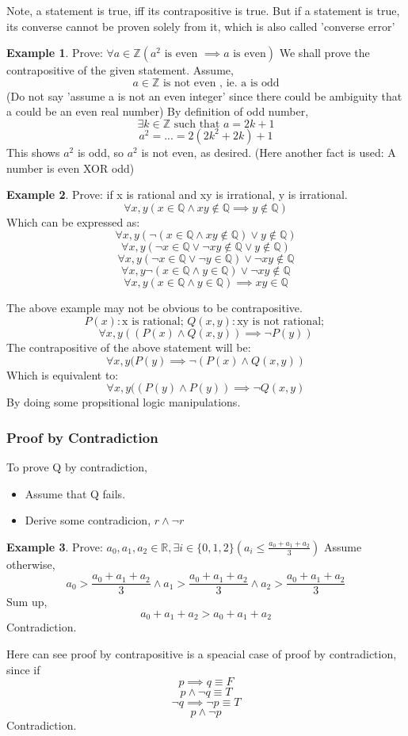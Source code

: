 \documentclass[14pt]{article}
\theoremstyle{definition}
\newtheorem*{example}{Example}
\begin{document}
Note, a statement is true, iff its contrapositive is true. But if a statement is true, its converse cannot be proven solely from it, which is also called 'converse error'
\begin{example}
    Prove: \(\forall a \in \mathbb{Z}(a^2 \text{ is even } \implies a \text{ is even}) \)
    We shall prove the contrapositive of the given statement.
    Assume, 
    \[a \in \mathbb{Z} \text{ is not even , ie. a is odd}\]
    (Do not say 'assume a is not an even integer' since there could be ambiguity that a could be an even real number)
    By definition of odd number, 
    \[\exists k \in \mathbb{Z} \text{ such that } a = 2k + 1\]
    \[a^2 = ... = 2(2k^2 + 2k) + 1\]
    This shows \(a^2\) is odd, so \(a^2\) is not even, as desired. 
    (Here another fact is used: A number is even XOR odd)
\end{example}

\begin{example}
    Prove: if x is rational and xy is irrational, y is irrational.
    \[\forall x, y(x \in \mathbb{Q} \land xy \notin \mathbb{Q} \implies y \notin \mathbb{Q})\]
    Which can be expressed as:
    \[\forall x, y(\neg(x \in \mathbb{Q} \land xy \notin \mathbb{Q}) \lor y \notin \mathbb{Q})\]
    \[\forall x, y(\neg x \in \mathbb{Q} \lor \neg xy \notin \mathbb{Q} \lor y \notin \mathbb{Q})\]
    \[\forall x, y(\neg x \in \mathbb{Q} \lor \neg y \in \mathbb{Q}) \lor \neg xy \notin \mathbb{Q}\]
    \[\forall x, y\neg (x \in \mathbb{Q} \land y \in \mathbb{Q}) \lor \neg xy \notin \mathbb{Q}\]
    \[\forall x, y(x \in \mathbb{Q} \land y \in \mathbb{Q}) \implies xy \in \mathbb{Q}\]
\end{example}
The above example may not be obvious to be contrapositive.
\[P(x): \text{x is rational; } Q(x, y): \text{xy is not rational; } \]
\[\forall x, y ((P(x)\land Q(x,y)) \implies \neg P(y))\]
The contrapositive of the above statement will be: 
\[\forall x, y (P(y) \implies \neg(P(x)\land Q(x,y))\]
Which is equivalent to:
\[\forall x, y ((P(y) \land P(y)) \implies \neg Q(x,y)\]
By doing some propsitional logic manipulations.
\subsubsection{Proof by Contradiction}
To prove Q by contradiction,
\begin{itemize}
    \item Assume that Q fails.
    \item Derive some contradicion, \(r \land \neg r\)
\end{itemize}
\begin{example}
    Prove: \(a_0, a_1, a_2 \in \mathbb{R}, \exists i \in \{0, 1, 2\} (a_i \leq \frac{a_0 + a_1 + a_2}{3})\)
    Assume otherwise, 
    \[a_0 > \frac{a_0 + a_1 + a_2}{3} \land a_1 > \frac{a_0 + a_1 + a_2}{3} \land a_2 > \frac{a_0 + a_1 + a_2}{3}\]
    Sum up, 
    \[a_0 + a_1 + a_2 > a_0 + a_1 + a_2\]
    Contradiction. 
\end{example}
Here can see proof by contrapositive is a speacial case of proof by contradiction, since if 
\[p \implies q \equiv F\]
\[p \land \neg q \equiv T\]
\[\neg q \implies \neg p \equiv T\]
\[p \land \neg p\]
Contradiction.
\end{document}
